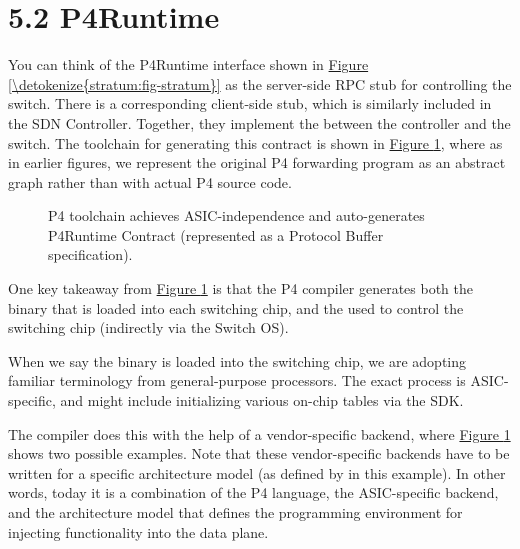 \documentclass[letterpaper,11pt,english]{sphinxmanual}
\let\sphinxpxdimen\pdfpxdimen\else\newdimen\sphinxpxdimen
\begin{document}
\section{5.2 P4Runtime}
\label{\detokenize{stratum:p4runtime}}
You can think of the P4Runtime interface shown in \hyperref[\detokenize{stratum:fig-stratum}]{Figure \ref{\detokenize{stratum:fig-stratum}}} as the server-side RPC stub for controlling the
switch. There is a corresponding client-side stub, which is similarly
included in the SDN Controller. Together, they implement the
 between the controller and the switch. The
toolchain for generating this contract is shown in \hyperref[\detokenize{stratum:fig-toolchain}]{Figure \ref{\detokenize{stratum:fig-toolchain}}}, where as in earlier figures, we represent the
original P4 forwarding program as an abstract graph rather than with
actual P4 source code.

\begin{figure}[htbp]
\centering
\capstart

\noindent\sphinxincludegraphics[width=600\sphinxpxdimen]{{Slide18}.png}
\caption{P4 toolchain achieves ASIC-independence and auto-generates
P4Runtime Contract (represented as a Protocol Buffer
specification).}\label{\detokenize{stratum:id4}}\label{\detokenize{stratum:fig-toolchain}}\end{figure}

One key takeaway from \hyperref[\detokenize{stratum:fig-toolchain}]{Figure \ref{\detokenize{stratum:fig-toolchain}}} is that the
P4 compiler generates both the binary that is loaded into each
switching chip, and the  used to control the
switching chip (indirectly via the Switch OS).%
\begin{footnote}[1]\sphinxAtStartFootnote
When we say the binary is loaded into the switching chip, we
are adopting familiar terminology from general-purpose
processors. The exact process is ASIC-specific, and might
include initializing various on-chip tables via the SDK.
%
\end{footnote} The compiler does
this with the help of a vendor-specific backend, where \hyperref[\detokenize{stratum:fig-toolchain}]{Figure
\ref{\detokenize{stratum:fig-toolchain}}} shows two possible examples. Note that these
vendor-specific backends have to be written for a specific
architecture model (as defined by  in this example).  In
other words, today it is a combination of the P4 language, the
ASIC-specific backend, and the architecture model that defines the
programming environment for injecting functionality into the data
plane.
\end{document}
